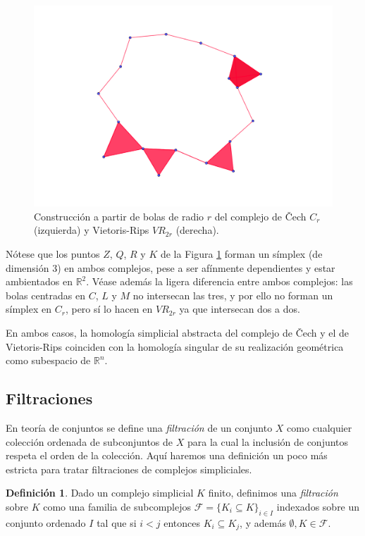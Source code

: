 \documentclass[12pt,a4paper,twoside]{article} %
\theoremstyle{plain}
\theoremstyle{definition}
\newtheorem{definicion}{Definición}[subsection]
\newcommand{\R}{\mathbb{R}}
\begin{document}
\begin{figure}[h!]
\includegraphics[scale=0.40]{img/vietorisrips.png}
\caption{Construcción a partir de bolas de radio $r$ del complejo de Čech $C_r$ (izquierda) y Vietoris-Rips $VR_{2r}$ (derecha).}
\label{cech-vr}
\end{figure}

Nótese que los puntos $Z$, $Q$, $R$ y $K$ de la Figura \ref{cech-vr} forman un símplex (de dimensión 3) en ambos complejos, pese a ser afínmente dependientes y estar ambientados en $\R^2$. Véase además la ligera diferencia entre ambos complejos: las bolas centradas en $C$, $L$ y $M$ no intersecan las tres, y por ello no forman un símplex en $C_r$, pero sí lo hacen en $VR_{2r}$ ya que intersecan dos a dos.

En ambos casos, la homología simplicial abstracta del complejo de Čech y el de Vietoris-Rips coinciden con la homología singular de su realización geométrica como subespacio de $\R^n$.

\subsection{Filtraciones}

En teoría de conjuntos se define una \emph{filtración} de un conjunto $X$ como cualquier colección ordenada de subconjuntos de $X$ para la cual la inclusión de conjuntos respeta el orden de la colección. Aquí haremos una definición un poco más estricta para tratar filtraciones de complejos simpliciales. 

\begin{definicion}
Dado un complejo simplicial $K$ finito, definimos una \emph{filtración} sobre $K$ como una familia de subcomplejos $\mathcal{F} = \lbrace K_i \subseteq K \rbrace_{i \in I}$ indexados sobre un conjunto ordenado $I$ tal que si $i<j$ entonces $K_i \subseteq K_j$, y además $\emptyset,K \in \mathcal{F}$.
\end{definicion}
\end{document}
